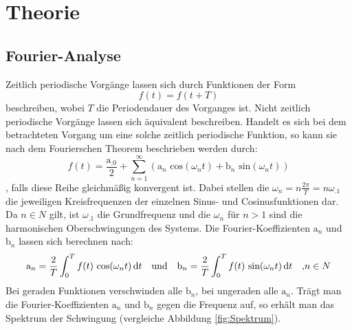 
\section{Theorie}
\label{sec:Theorie}

\subsection{Fourier-Analyse}\label{subsec:F-A}
Zeitlich periodische Vorgänge lassen sich durch Funktionen der Form
\[
f(t) = f(t+T)
\]
beschreiben, wobei $T$ die Periodendauer des Vorganges ist.
Nicht zeitlich periodische Vorgänge lassen sich äquivalent beschreiben.
Handelt es sich bei dem betrachteten Vorgang um eine solche zeitlich periodische Funktion, so kann sie nach dem Fourierschen Theorem beschrieben werden durch:
\begin{equation}
f(t) = \frac{\mathrm{a}_.0}{2} + \sum_{n=1}^\infty\left(\mathrm{a}_n\text{ cos}(\omega_nt)+\mathrm{b}_n\text{ sin}(\omega_nt)\right)
\end{equation}
, falls diese Reihe gleichmäßig konvergent ist. 
Dabei stellen die $\omega_n=n\frac{2\pi}{T}=n\omega_.1$ die jeweiligen Kreisfrequenzen der einzelnen Sinus- und Cosinusfunktionen dar. Da $n\in N$ gilt, ist $\omega_.1$ die Grundfrequenz und die $\omega_n$ für $n>1$ sind die harmonischen Oberschwingungen des Systems.
Die Fourier-Koeffizienten $\mathrm{a}_n$ und $\mathrm{b}_n$ lassen sich berechnen nach:
\begin{equation}
\mathrm{a}_n = \frac{2}{T}\int_0^Tf(t)\text{ cos}(\omega_nt)\mathop{}\!\mathrm{d} t\text{\hspace{1em}und\hspace{1em}}\mathrm{b}_n=\frac{2}{T}\int_0^Tf(t)\text{ sin}(\omega_nt)\mathop{}\!\mathrm{d} t\text{\hspace{1em},}n\in N
\end{equation}   
Bei geraden Funktionen verschwinden alle $\mathrm{b}_n$, bei ungeraden alle $\mathrm{a}_n$. 
Trägt man die Fourier-Koeffizienten $\mathrm{a}_n$ und $\mathrm{b}_n$ gegen die Frequenz auf, so erhält man das Spektrum der Schwingung (vergleiche Abbildung \ref{fig:Spektrum}).
